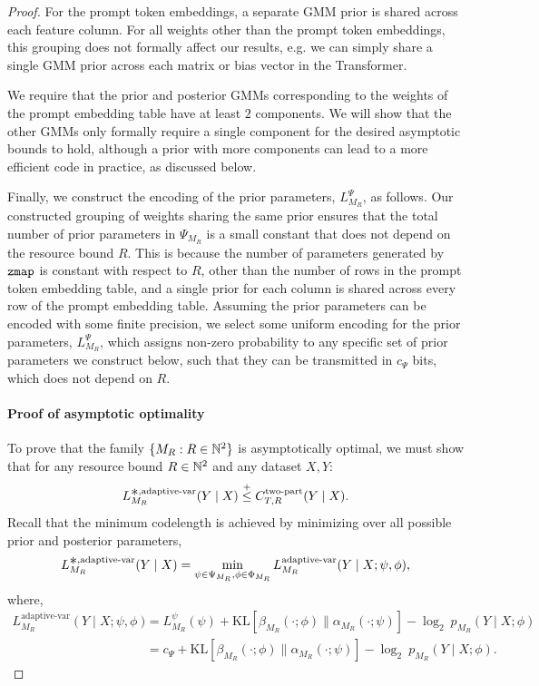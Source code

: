 \begin{proof}
For the prompt token embeddings, a separate GMM prior is shared across each feature column.
For all weights other than the prompt token embeddings, this grouping does not formally affect our results, e.g. we can simply share a single GMM prior across each matrix or bias vector in the Transformer. 

We require that the prior and posterior GMMs corresponding to the weights of the prompt embedding table have at least $2$ components. We will show that the other GMMs only formally require a single component for the desired asymptotic bounds to hold, although a prior with more components can lead to a more efficient code in practice, as discussed below.

Finally, we construct the encoding of the prior parameters, $L_{M_R}^\Psi$, as follows. Our constructed grouping of weights sharing the same prior ensures that the total number of prior parameters in $\Psi_{M_R}$ is a small constant that does not depend on the resource bound $R$. This is because the number of parameters generated by $\texttt{zmap}$ is constant with respect to $R$, other than the number of rows in the prompt token embedding table, and a single prior for each column is shared across every row of the prompt embedding table. Assuming the prior parameters can be encoded with some finite precision, we select some uniform encoding for the prior parameters, $L_{M_R}^\Psi$, which assigns non-zero probability to any specific set of prior parameters we construct below, such that they can be transmitted in $c_\Psi$ bits, which does not depend on $R$.

\paragraph{Proof of asymptotic optimality}
To prove that the family $\{M_R : R \in {\mathbb{N}^2} \}$ is asymptotically optimal, we must show that for any resource bound $R \in {\mathbb{N}^2}$ and any dataset $X,Y$:
\begin{equation}
L^{\bigast,\text{adaptive-var}}_{M_R}(Y \mid X) \leqc C^{\text{two-part}}_{T,R}(Y \mid X).
\end{equation}
Recall that the minimum codelength is achieved by minimizing over all possible prior and posterior parameters,
\begin{equation*}
    L^{\bigast,\text{adaptive-var}}_{M_R}(Y \mid X) = \min_{\psi \in \Psi_{M_R},\phi \in \Phi_{M_R}} L^{\text{adaptive-var}}_{M_R}(Y \mid X;\psi,\phi),
\end{equation*} 
where,
\begin{align*}
    L_{M_R}^{\text{adaptive-var}}(Y \mid X; \psi,\phi) &= L^\psi_{M_R}(\psi) + \text{KL}\left[ \beta_{M_R}(\cdot;\phi) \parallel \alpha_{M_R}(\cdot;\psi) \right] - \log_2~ p_{M_R}(Y \mid X; \phi) \\
    &= c_\Psi + \text{KL}\left[ \beta_{M_R}(\cdot;\phi) \parallel \alpha_{M_R}(\cdot;\psi) \right] - \log_2~ p_{M_R}(Y \mid X; \phi).
\end{align*}


\end{proof}
